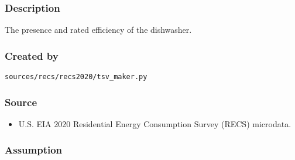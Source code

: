 \subsubsection{Description}\label{description-32}

The presence and rated efficiency of the dishwasher.

\subsubsection{Created by}\label{created-by-32}

\texttt{sources/recs/recs2020/tsv\_maker.py}

\subsubsection{Source}\label{source-31}

\begin{itemize}
 
\item
  U.S. EIA 2020 Residential Energy Consumption Survey (RECS) microdata.
\end{itemize}

\subsubsection{Assumption}\label{assumption-17}

